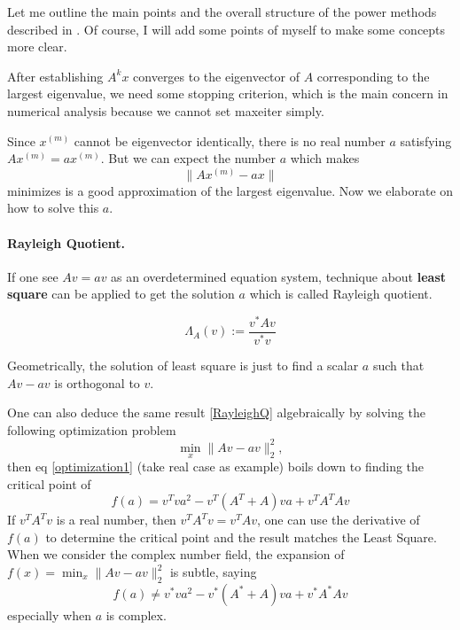 \documentclass[12pt]{article}
\begin{document}
Let me outline the main points and the overall structure of the power methods described in \cite{borm2012numerical}.
Of course, I will add some points of myself to make some concepts more clear.

After establishing $A^{k}x$ converges to the eigenvector of $A$ corresponding to the largest eigenvalue, 
we need some stopping criterion, which is the main concern in numerical analysis because we cannot set max\textunderscore eiter simply. 

Since $x^{(m)}$ cannot be eigenvector identically, there is no real number $a$ satisfying $Ax^{(m)} = ax^{(m)}$. 
But we can expect the number $a$ which makes
$$
\|A x^{(m)}-ax\| 
$$
minimizes is a good approximation of the largest eigenvalue. Now we elaborate on how to solve this $a$.

\paragraph{Rayleigh Quotient.} If one see $Av = av$ as an overdetermined equation system, technique about \textbf{least square} can be applied
to get the solution $a$ which is called Rayleigh quotient.

\begin{equation}
    \label{RayleighQ}
    \Lambda_{A}(v) := \frac{v^{*}Av}{v^{*}v}
\end{equation}

Geometrically, the solution of least square is just to find a scalar $a$ such that $Av-av$ is orthogonal to $v$.

\begin{tcolorbox}[colback=gray!10, colframe=black, title=Shaded Box]
    One can also deduce the same result \eqref{RayleighQ} algebraically by solving the following optimization problem
    \begin{equation}
        \label{optimization1}
        \operatorname{min}_{x} \|Av-a v\|_{2}^{2},
    \end{equation}
    then eq \eqref{optimization1} (take real case as example) boils down to finding the critical point of
    $$
    f(a)=v^{T}v a^{2}- v^{T}(A^{T}+A)v a+v^{T}A^{T}Av
    $$
    If $v^{T}A^{T}v$ is a real number, then $v^{T}A^{T}v = v^{T}Av$, one can use the derivative of $f(a)$ to determine the critical point and the result matches the Least Square. 
    When we consider the complex number field, the expansion of $f(x)=\operatorname{min}_{x} \|Av-a v\|_{2}^{2}$ is subtle, saying
    $$
    f(a)\neq v^{*}v a^{2}- v^{*}(A^{*}+A)v a+v^{*}A^{*}Av
    $$
    especially when $a$ is complex.
    \end{tcolorbox}
\end{document}
